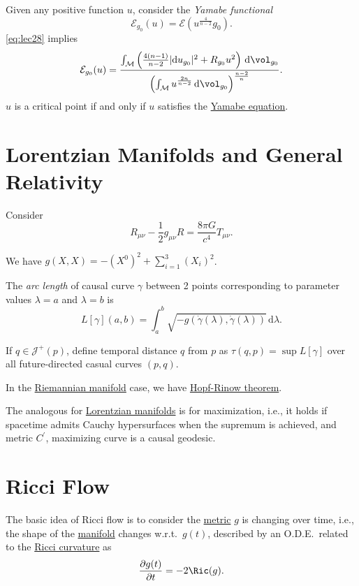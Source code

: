 Given any positive function \(u\), consider the \emph{Yamabe functional}
\[
	\mathcal{E} _{g_0}(u) = \mathcal{E} (u^{\frac{4}{n-2}} g_0).
\]
\autoref{eq:lec28} implies
\[
	\mathcal{E} _{g_0}(u) = \frac{\int _\mathcal{M} \left( \frac{4(n-1)}{n-2}\vert \mathrm{d} u_{g_0} \vert ^2 + R_{g_0}u^2 \right) \,\mathrm{d} \vol_{g_0} }{\left( \int _\mathcal{M} u^{\frac{2n}{n-2}} \,\mathrm{d} \vol_{g_0} \right) ^{\frac{n-2}{n}}}.
\]
\(u\) is a critical point if and only if \(u\) satisfies the \hyperref[eq:Yamabe]{Yamabe equation}.

\section{Lorentzian Manifolds and General Relativity}
Consider
\[
	R_{\mu \nu } - \frac{1}{2}g_{\mu \nu } R = \frac{8 \pi G}{c^4} T_{\mu \nu }.
\]

\begin{remark}
	We have \(g(X, X) = -(X^0)^2 + \sum_{i=1}^3 (X_i)^2\).
\end{remark}

\begin{definition}
	The \emph{arc length} of causal curve \(\gamma \) between 2 points corresponding to parameter values \(\lambda = a\) and \(\lambda = b\) is
	\[
		L[\gamma ](a, b) = \int_{a}^{b} \sqrt{-g(\dot{\gamma }(\lambda ), \dot{\gamma }(\lambda )  )} \,\mathrm{d}\lambda .
	\]
\end{definition}

If \(q\in \mathcal{J} ^+(p)\), define temporal distance \(q\) from \(p\) as \(\tau (q, p) = \sup L[\gamma ]\) over  all future-directed casual curves \((p, q)\).

\begin{prev}
	In the \hyperref[def:Riemannian-manifold]{Riemannian manifold} case, we have \hyperref[thm:Hopf-Rinow]{Hopf-Rinow theorem}.
\end{prev}

The analogous for \hyperref[def:Lorentzian-metric]{Lorentzian manifolds} is for maximization, i.e., it holds if spacetime admits Cauchy hypersurfaces when the supremum is achieved, and metric \(C^{\prime} \), maximizing curve is a causal geodesic.

\section{Ricci Flow}
The basic idea of Ricci flow is to consider the \hyperref[def:Riemannian-metric]{metric} \(g\) is changing over time, i.e., the shape of the \hyperref[def:Riemannian-manifold]{manifold} changes w.r.t.\ \(g(t)\), described by an O.D.E.\ related to the \hyperref[def:Ricci-curvature]{Ricci curvature} as
\[
	\frac{\partial g(t)}{\partial t} = -2 \Ric(g) .
\]
